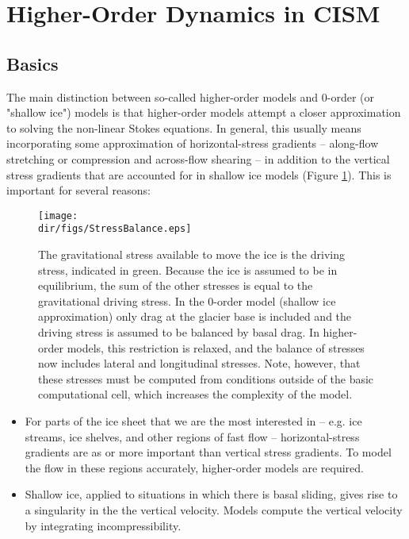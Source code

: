
\section{Higher-Order Dynamics in CISM}

\subsection{Basics}
The main distinction between so-called higher-order models and 0-order (or "shallow ice") models is that higher-order models attempt a closer approximation to solving the non-linear Stokes equations. In general, this usually means incorporating some approximation of horizontal-stress gradients -- along-flow stretching or compression and across-flow shearing -- in addition to the vertical stress gradients that are accounted for in shallow ice models (Figure \ref{fig:stressbalance}). This is important for several reasons:

\begin{figure}
  \begin{center}
    \texttt{[image: \\dir/figs/StressBalance.eps]}
  \end{center}
  \caption{The gravitational stress available to move the ice is the driving stress, indicated in green. Because the ice is assumed to be in equilibrium, the sum of the other stresses is equal to the gravitational driving stress. In the 0-order model (shallow ice approximation) only drag at the glacier base is included and the driving stress is assumed to be balanced by basal drag. In higher-order models, this restriction is relaxed, and the balance of stresses now includes lateral and longitudinal stresses. Note, however, that these stresses must be computed from conditions outside of the basic computational cell, which increases the complexity of the model.}
  \label{fig:stressbalance}
\end{figure} 

\begin{itemize}
\item For parts of the ice sheet that we are the most interested in -- e.g. ice streams, ice shelves, and other regions of fast flow -- horizontal-stress gradients are as or more important than vertical stress gradients. To model the flow in these regions accurately, higher-order models are required.
\item Shallow ice, applied to situations in which there is basal sliding, gives rise to a singularity in the the vertical velocity. Models compute the vertical velocity by integrating incompressibility.
\end{itemize}

